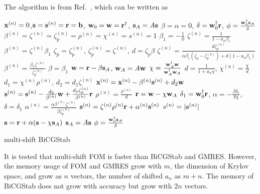 The algorithm is from Ref.~\cite{shiftedBiCGStab}, which can be written as
\begin{algorithm}[H]
\begin{algorithmic}
\State ${\bf x}^{(n)}=0$,${\bf s}={\bf s}^{(n)}={\bf r}={\bf b}$, ${\bf w}_0={\bf w}={\bf r}^{\dagger}$, ${\bf s}_A=A{\bf s}$
\State $\beta=\alpha =0$, $\delta = {\bf w}_0^{\dagger}{\bf r}$, $\phi = \frac{{\bf w}_0^{\dagger}{\bf s}_A}{\delta}$
\State $\beta ^{(n)}=\zeta ^{(n)}=\zeta _p^{(n)}=\rho ^{(n)}=\chi ^{(n)}=s^{(n)}=1$
    \State $\beta _1 = -\frac{1}{\phi}$
            \State $\zeta ^{(n)}=\frac{1}{1-a_n \beta _1}$
            \State $\beta ^{(n)}=\zeta ^{(n)} \beta _1$
        \Else
            \State $\zeta_p = \zeta_p^{(n)}$, $\zeta_p^{(n)}=\zeta ^{(n)}$, $d=\zeta _p \beta$
            \State $\zeta ^{(n)}=\frac{d \zeta_p^{(n)}}{\alpha \beta _ 1 (\zeta _p-\zeta_p^{(n)})+d(1-a_n \beta _1)}$
            \State $\beta ^{(n)}=\frac{\beta _1 \zeta ^{(n)}}{\zeta_p^{(n)}}$
        \EndIf
    \EndFor
    \State $\beta=\beta_1$
    \State ${\bf w}={\bf r}-\beta {\bf s}_A$, ${\bf w}_A=A{\bf w}$
    \State $\chi = \frac{{\bf w}_A^{\dagger} {\bf w}}{{\bf w}_A^{\dagger}{\bf w}_A}$
        \State $d=\frac{1}{1+a_n \chi}$, $\chi ^{(n)}=\frac{\chi}{d}$
        \State $d_1=\chi ^{(n)}\rho ^{(n)}$, $d_2=d_1 \zeta ^{(n)}$
        \State ${\bf x}^{(n)}={\bf x}^{(n)}-\beta ^{(n)}{\bf s}^{(n)}+d_2 {\bf w}$
        \State ${\bf s}^{(n)}={\bf s}^{(n)}-\frac{d_2}{\beta ^{(n)}}{\bf w}+\frac{d_1 \zeta _p^{(n)}}{\beta ^{(n)}} {\bf r}$
        \State $\rho ^{(n)}=\frac{\rho ^{(n)}}{d}$
    \EndFor
    \State ${\bf r}={\bf w}-\chi {\bf w}_A$
    \State $\delta _1={\bf w}_0^{\dagger} {\bf r}$, $\alpha = -\frac{\beta \delta _1}{\delta \chi}$, $\delta = \delta _1$
        \State $\alpha ^{(n)}=\frac{\alpha \beta ^{(n)}\zeta ^{(n)}}{\beta \zeta_p ^{(n)}}$
        \State ${\bf s}^{(n)}= \zeta ^{(n)}\rho ^{(n)} {\bf r}+ \alpha ^{(n)}{\bf s}^{(n)}$
        \State $s^{(n)}=|{\bf s}^{(n)}|$
    \EndFor
    \State ${\bf s}={\bf r}+\alpha ({\bf s}-\chi {\bf s}_A)$
    \State ${\bf s}_A=A{\bf s}$
    \State $\phi = \frac{{\bf w}_0^{\dagger} {\bf s}_A}{\delta}$
\EndFor
\end{algorithmic}
\caption{\label{alg.BiCGStab.shifted}multi-shift BiCGStab}
\end{algorithm}

\textcolor[rgb]{0,0,1}{It is tested that multi-shift FOM is faster than BiCGStab and GMRES. However, the memory usage of FOM and GMRES grow with $m$, the dimension of Krylov space, and grow as $n$ vectors, the number of shifted $a_n$ as $m+n$. The memory of BiCGStab does not grow with accuracy but grow with $2n$ vectors.}

